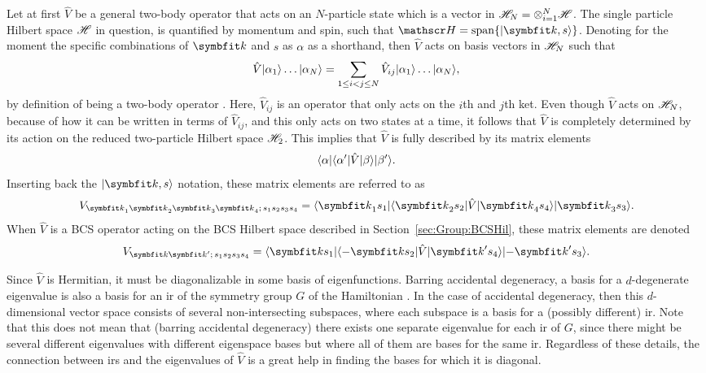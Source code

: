 Let at first $\hat{V}$ be a general two-body operator that acts on an $N$-particle state which is a vector in $\mathscr{H}_N = \otimes_{i=1}^N\mathscr{H}$. The
single particle Hilbert space $\mathscr{H}$ in question, is quantified by momentum and spin, such that $\hil=\Span\{\ket{\v{k},s}\}$. Denoting for the moment
the specific combinations of $\v{k}$ and $s$ as $\alpha$ as a shorthand, then $\hat{V}$ acts on basis vectors in $\mathscr{H}_N$ such that
\begin{equation}
    \label{eq:Group:Potential:twoBodyInteraction}
    \hat{V}\lvert \alpha_1 \rangle\ldots\lvert \alpha_N \rangle = \sum_{1\leq i<j\leq N}\hat{V}_{ij}\lvert \alpha_1 \rangle\ldots\lvert \alpha_N \rangle,
\end{equation}
by definition of being a two-body operator \cite{NegeleOrland98}. Here, $\hat{V}_{ij}$ is an operator that only acts on the $i$th and $j$th ket. Even though $\hat{V}$ acts on
$\mathscr{H}_N$, because of how it can be written in terms of $\hat{V}_{ij}$, and this only acts on two states at a time, it follows that $\hat{V}$ is
completely determined by its action on the reduced two-particle Hilbert space $\mathscr{H}_2$. This implies that $\hat{V}$ is fully described by its matrix elements
\begin{equation}
    \label{eq:Group:Potential:genTwoBodyMatrixElem}
    \langle \alpha \rvert\langle \alpha' \rvert\hat{V}\lvert \beta \rangle\lvert \beta' \rangle.
\end{equation}
Inserting back the $\ket{\v{k},s}$ notation, these matrix elements are referred to as
\begin{equation}
    \label{eq:Group:Potential:momSpinPotentialMatrixElems}
    V_{\v{k}_1\v{k}_2\v{k}_3\v{k}_4;\,s_1s_2s_3s_4} = \bra{\v{k}_1s_1}\bra{\v{k}_2s_2}\hat{V}\ket{\v{k}_4s_4}\ket{\v{k}_3s_3}.
\end{equation}
When $\hat{V}$ is a BCS operator acting on the BCS Hilbert space described in Section~\ref{sec:Group:BCSHil}, these matrix elements are denoted
\begin{equation}
    \label{eq:Group:Potential:bcsTwoBodyMatrixElem}
    V_{\v{k}\v{k}';\,s_1s_2s_3s_4} = \bra{\v{k}s_1}\bra{-\v{k}s_2}\hat{V}\ket{\v{k}'s_4}\ket{-\v{k}'s_3}.
\end{equation}

Since $\hat{V}$ is Hermitian, it must be diagonalizable in some basis of eigenfunctions. Barring accidental degeneracy, a basis for a $d$-degenerate
eigenvalue is also a basis for an \ac{ir} of the symmetry group $G$ of the Hamiltonian \cite{Inui90}. In the case of accidental degeneracy,
then this $d$-dimensional vector space consists of several non-intersecting subspaces, where each subspace is a basis for a (possibly different) \ac{ir}. Note
that this does not mean that (barring accidental degeneracy) there exists one separate eigenvalue for each \ac{ir} of $G$, since there might be
several different eigenvalues with different eigenspace bases but where all of them are bases for the same \ac{ir}. Regardless of these details,
the connection between \ac{ir}s and the eigenvalues of $\hat{V}$ is a great help in finding the bases for which it is
diagonal.

